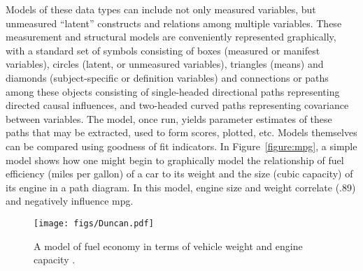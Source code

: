 \documentclass{article}
\begin{document}
Models of these data types can include not only measured variables, but unmeasured ``latent'' constructs and relations among multiple variables. These measurement and structural models are conveniently represented graphically, with a standard set of symbols consisting of boxes (measured or manifest variables), circles (latent, or unmeasured variables), triangles (means) and diamonds (subject-specific or definition variables) and connections or paths among these objects consisting of single-headed directional paths representing directed causal influences, and two-headed curved paths representing covariance between variables. The model, once run, yields parameter estimates of these paths that may be extracted, used to form scores, plotted, etc. Models themselves can be compared using goodness of fit indicators. In Figure~\ref{figure:mpg}, a simple model shows how one might begin to graphically model the relationship of fuel efficiency (miles per gallon) of a car to its weight and the size (cubic capacity) of its engine in a path diagram. In this model, engine size and weight correlate (.89) and negatively influence mpg.

\begin{figure}[htbp]
	\centering
  	\texttt{[image: figs/Duncan.pdf]}
	\caption{A model of fuel economy in terms of vehicle weight and engine capacity .\label{figure:Duncan}}
\end{figure}

\end{document}

